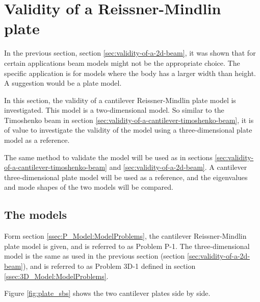 \documentclass[../../main.tex]{subfiles}
\begin{document}
\section{Validity of a Reissner-Mindlin plate} \label{sec:validity-of-a-plate}

In the previous section, section \ref{sec:validity-of-a-2d-beam}, it was shown that for certain applications beam models might not be the appropriate choice. The specific application is for models where the body has a larger width than height. A suggestion would be a plate model.

In this section, the validity of a cantilever Reissner-Mindlin plate model is investigated. This model is a two-dimensional model. So similar to the Timoshenko beam in section \ref{sec:validity-of-a-cantilever-timoshenko-beam}, it is of value to investigate the validity of the model using a three-dimensional plate model as a reference.

The same method to validate the model will be used as in sections \ref{sec:validity-of-a-cantilever-timoshenko-beam} and \ref{sec:validity-of-a-2d-beam}. A cantilever three-dimensional plate model will be used as a reference, and the eigenvalues and mode shapes of the two models will be compared.

\subsection{The models}
Form section \ref{ssec:P_Model:ModelProblems}, the cantilever Reissner-Mindlin plate model is given, and is referred to as Problem P-1. The three-dimensional model is the same as used in the previous section (section \ref{sec:validity-of-a-2d-beam}), and is referred to as Problem 3D-1 defined in section \ref{ssec:3D_Model:ModelProblems}.

Figure \ref{fig:plate_sbs} shows the two cantilever plates side by side.
\end{document}

